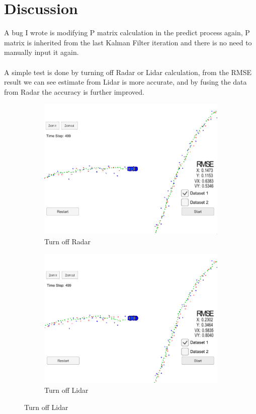 \documentclass{article}
\begin{document}
\section{Discussion}
A bug I wrote is modifying P matrix calculation in the predict process again, P matrix is inherited from the last Kalman Filter iteration and there is no need to manually input it again.\\\\
A simple test is done by turning off Radar or Lidar calculation, from the RMSE result we can see estimate from Lidar is more accurate, and by fusing the data from Radar the accuracy is further improved.\\

\begin{figure}
     \centering
     \begin{subfigure}[b]{0.4\textwidth}
         \centering
         \includegraphics[width=\textwidth]{Lidar.png}
         \caption{Turn off Radar}
         \label{fig4a}
     \end{subfigure}
     \hfill
     \begin{subfigure}[b]{0.4\textwidth}
         \centering
         \includegraphics[width=\textwidth]{Radar.png}
         \caption{Turn off Lidar}
         \label{fig4b}
     \end{subfigure}
\end{figure}
\end{document}
